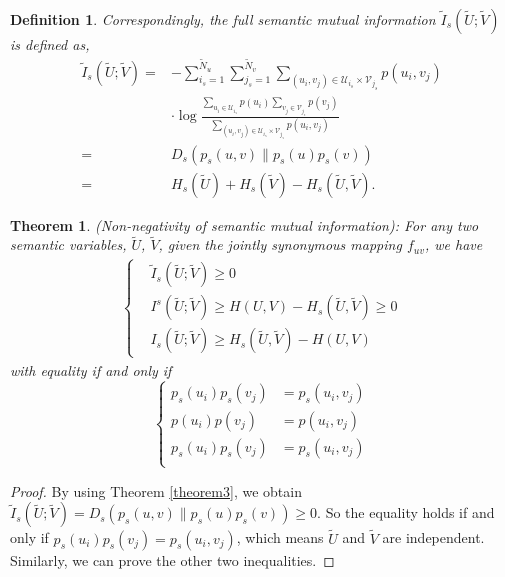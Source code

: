 \documentclass[12pt, draftclsnofoot,onecolumn]{IEEEtran}
\newtheorem{theorem}{\bf{Theorem}}
\newtheorem{definition}{\bf{Definition}}
\begin{document}
\begin{definition}
Correspondingly, the full semantic mutual information $\tilde{I}_s(\tilde{U};\tilde{V})$ is defined as,
\begin{equation}
\begin{aligned}
\tilde{I}_s (\tilde{U};\tilde{V})=&-\sum_{i_s=1}^{{\tilde{N}}_u}\sum_{j_s=1}^{{\tilde{N}}_v}\sum_{(u_i,v_j)\in \mathcal{U}_{i_s}\times \mathcal{V}_{j_s}}p\left(u_i,v_j\right) \\
&\cdot \log \frac{\sum_{u_i \in \mathcal{U}_{i_s}}p\left(u_i\right) \sum_{v_j \in \mathcal{V}_{j_s}}p\left(v_j\right)}{\sum_{(u_i,v_j)\in \mathcal{U}_{i_s}\times \mathcal{V}_{j_s}}p\left(u_i,v_j\right)}\\
=&D_s\left(p_s\left(u,v\right)\|p_s(u)p_s(v)\right)\\
=&H_s(\tilde{U})+H_s(\tilde{V})-H_s(\tilde{U},\tilde{V}).
\end{aligned}
\end{equation}
\end{definition}

\begin{theorem}
(Non-negativity of semantic mutual information): For any two semantic variables, $\tilde{U}$, $\tilde{V}$, given the jointly synonymous mapping $f_{uv}$, we have
\begin{align}
\left\{\begin{aligned}
&\tilde{I}_s(\tilde{U};\tilde{V})\geq 0\\
&I^s (\tilde{U};\tilde{V} )\geq H(U,V)-H_s(\tilde{U},\tilde{V})\geq 0\\
&I_s (\tilde{U};\tilde{V} )\geq H_s(\tilde{U},\tilde{V})-H(U,V)
\end{aligned}
\right.
\end{align}
with equality if and only if %
\begin{equation}
\left\{\begin{aligned}
p_s\left(u_i\right) p_s\left(v_j\right)&=p_s\left(u_i,v_j\right)\\
p\left(u_i\right)p\left(v_j\right)&=p\left(u_i,v_j\right)\\
p_s\left(u_i\right) p_s\left(v_j\right)&=p_s\left(u_i,v_j\right)\\
\end{aligned}\right.
\end{equation}
\end{theorem}
\begin{proof}
By using Theorem \ref{theorem3}, we obtain $\tilde{I}_s (\tilde{U};\tilde{V})=D_s\left(p_s\left(u,v\right)\|p_s(u)p_s(v)\right)\geq 0$. So the equality holds if and only if $p_s\left(u_i\right) p_s\left(v_j\right)=p_s\left(u_i,v_j\right)$, which means $\tilde{U}$ and $\tilde{V}$ are independent. Similarly, we can prove the other two inequalities.
\end{proof}
\end{document}
